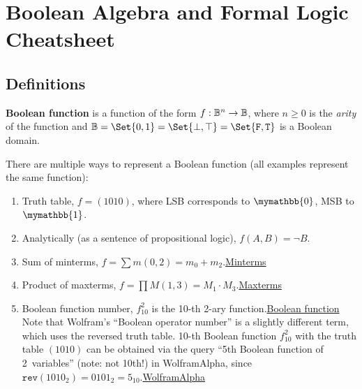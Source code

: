 \documentclass[a4paper,10pt]{article}
\begin{document}

\setcounter{section}{2}
\section{Boolean Algebra and Formal Logic Cheatsheet}

\subsection{Definitions}

\begin{terms}
    \item \raggedright \textbf{Boolean function} is a function of the form $f: \mathbb{B}^n \to \mathbb{B}$, where $n \geq 0$ is the \emph{arity} of the function and $\Bool =\nobreak \Set{0, 1} =\nobreak \Set{\bot, \top} =\nobreak \Set{\texttt{F}, \texttt{T}}$ is a Boolean domain.

    \item There are multiple ways to represent a Boolean function (all examples represent the same function):
    \begin{enumerate}[left=6pt .. 18pt]
        \item Truth table, \eg $f = (1010)$, where LSB corresponds to $\mymathbb{0}$, MSB to $\mymathbb{1}$.
        \item Analytically (as a sentence of propositional logic), \eg $f(A,B) = \neg B$.
        \item Sum of minterms, \eg $f = \sum m(0,2) = m_0 + m_2$.\hfill\href{http://www.cs.ucr.edu/~ehwang/courses/cs120a/minterms.pdf}{Minterms}
        \item Product of maxterms, \eg $f = \prod M(1,3) = M_1 \cdot M_3$.\hfill\href{http://www.cs.ucr.edu/~ehwang/courses/cs120a/minterms.pdf#page=2}{Maxterms}
        \item Boolean function number, \eg $f^{2}_{10}$ is the 10-th 2-ary function.\hfill\href{https://mathworld.wolfram.com/BooleanFunction.html}{Boolean function} \\
        Note that Wolfram's \enquote{Boolean operator number} is a slightly different term, which uses the reversed truth table. 10-th Boolean function $f^{2}_{10}$ with the truth table $(1010)$ can be obtained via the query \enquote{5th Boolean function of 2~variables} (note: not 10th!) in WolframAlpha, since $\texttt{rev}(1010_2) = 0101_2 = 5_{10}$.\hfill\href{https://bit.ly/3nFbad5}{WolframAlpha}
    \end{enumerate}


\end{terms}
\end{document}

